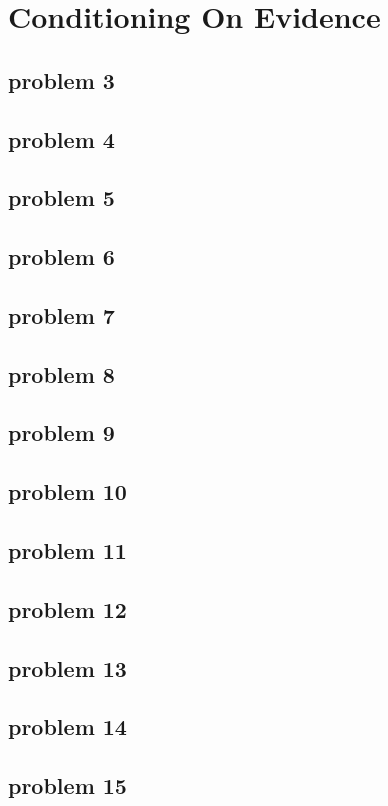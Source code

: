 \section{Conditioning On Evidence}

\subsection{problem 3}


\subsection{problem 4}


\subsection{problem 5}


\subsection{problem 6}


\subsection{problem 7}


\subsection{problem 8}


\subsection{problem 9}


\subsection{problem 10}


\subsection{problem 11}


\subsection{problem 12}


\subsection{problem 13}


\subsection{problem 14}


\subsection{problem 15}
